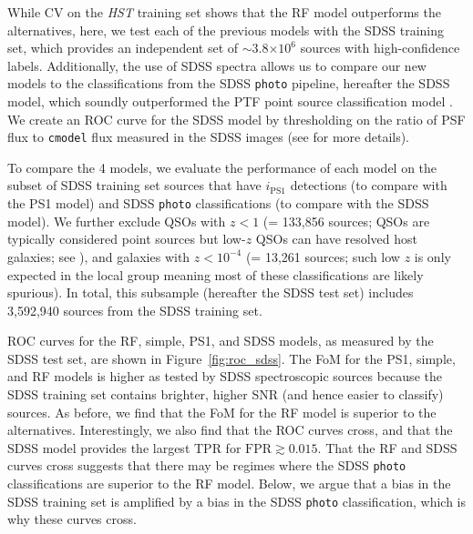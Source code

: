 \documentclass[twocolumn, dvipdfmx]{aastex62}
\begin{document}
\begin{CJK*}{UTF8}{gbsn}
While CV on the \textit{HST} training set shows that the RF model
outperforms the alternatives, here, we test each of the previous models with
the SDSS training set, which provides an independent set of $\sim$3.8$\times
10^6$ sources with high-confidence labels. Additionally, the use of SDSS
spectra allows us to compare our new models to the classifications from the
SDSS \texttt{photo} pipeline, hereafter the SDSS model, which soundly
outperformed the PTF point source classification model \citep{Miller17}. We
create an ROC curve for the SDSS model by thresholding on the ratio of PSF
flux to \texttt{cmodel} flux measured in the SDSS images (see
\citealt{Miller17} for more details).

To compare the 4 models, we evaluate the performance of each model on the
subset of SDSS training set sources that have $i_\mathrm{PS1}$ detections
(to compare with the PS1 model) and SDSS \texttt{photo} classifications (to
compare with the SDSS model). We further exclude QSOs with $z < 1$ (=
133,856 sources; QSOs are typically considered point sources but low-$z$
QSOs can have resolved host galaxies; see \citealt{Miller17}), and galaxies
with $z < 10^{-4}$ (= 13,261 sources; such low $z$ is only expected in the
local group meaning most of these classifications are likely spurious). In
total, this subsample (hereafter the SDSS test set) includes 3,592,940
sources from the SDSS training set.

ROC curves for the RF, simple, PS1, and SDSS models, as measured by the SDSS
test set, are shown in Figure~\ref{fig:roc_sdss}. The FoM for the PS1,
simple, and RF models is higher as tested by SDSS spectroscopic sources
because the SDSS training set contains brighter, higher SNR (and hence
easier to classify) sources. As before, we find that the FoM for the RF
model is superior to the alternatives. Interestingly, we also find that the
ROC curves cross, and that the SDSS model provides the largest TPR for
$\mathrm{FPR} \gtrsim 0.015$. That the RF and SDSS curves cross suggests
that there may be regimes where the SDSS \texttt{photo} classifications are
superior to the RF model. Below, we argue that a bias in the SDSS training
set is amplified by a bias in the SDSS \texttt{photo} classification, which
is why these curves cross.



\end{CJK*}
\end{document}
